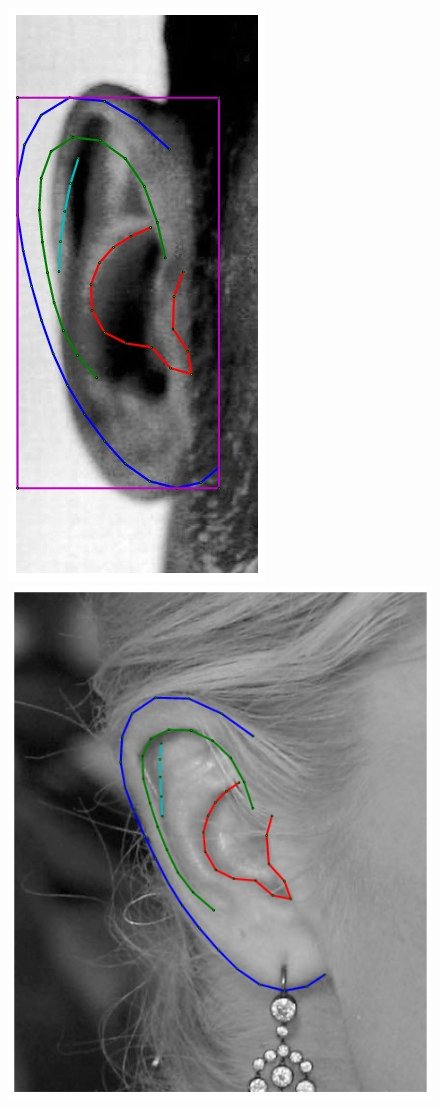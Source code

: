 \begin{figure}
    \hfill
    \includegraphics[height=\flowh]{resources/Ear_Deformable_Model/fittings/initial_0004}
    \hfill
    \includegraphics[height=\flowh]{resources/Ear_Deformable_Model/fittings/final_0000}

\end{figure}
